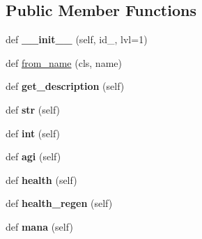 \subsection*{Public Member Functions}
\begin{DoxyCompactItemize}
\item 
def {\bfseries \+\_\+\+\_\+init\+\_\+\+\_\+} (self, id\+\_\+, lvl=1)\hypertarget{classatod_1_1heroes_1_1_hero_a586daa470e18af152e442e70a594155b}{}\label{classatod_1_1heroes_1_1_hero_a586daa470e18af152e442e70a594155b}

\item 
def \hyperlink{classatod_1_1heroes_1_1_hero_ac2ba0862900a63e0a1f1d7a09111eb5f}{from\+\_\+name} (cls, name)
\item 
def {\bfseries get\+\_\+description} (self)\hypertarget{classatod_1_1heroes_1_1_hero_a830f17ec9fc71501b8bea6224814719f}{}\label{classatod_1_1heroes_1_1_hero_a830f17ec9fc71501b8bea6224814719f}

\item 
def {\bfseries str} (self)\hypertarget{classatod_1_1heroes_1_1_hero_ae64ab4c614f0131ffcc8d8fdfc4fc589}{}\label{classatod_1_1heroes_1_1_hero_ae64ab4c614f0131ffcc8d8fdfc4fc589}

\item 
def {\bfseries int} (self)\hypertarget{classatod_1_1heroes_1_1_hero_aacbd6a3822e3cf59cd4108c4ea38d9e1}{}\label{classatod_1_1heroes_1_1_hero_aacbd6a3822e3cf59cd4108c4ea38d9e1}

\item 
def {\bfseries agi} (self)\hypertarget{classatod_1_1heroes_1_1_hero_a267930ec44b1f9d9a389ec899775fddf}{}\label{classatod_1_1heroes_1_1_hero_a267930ec44b1f9d9a389ec899775fddf}

\item 
def {\bfseries health} (self)\hypertarget{classatod_1_1heroes_1_1_hero_a2deaa7c2b1e486817cdbfdb91903910f}{}\label{classatod_1_1heroes_1_1_hero_a2deaa7c2b1e486817cdbfdb91903910f}

\item 
def {\bfseries health\+\_\+regen} (self)\hypertarget{classatod_1_1heroes_1_1_hero_ad1ca633d554d2fe7910850049d204481}{}\label{classatod_1_1heroes_1_1_hero_ad1ca633d554d2fe7910850049d204481}

\item 
def {\bfseries mana} (self)\hypertarget{classatod_1_1heroes_1_1_hero_a9ccad513e9c5f0921b3d4fe6c3abaa85}{}\label{classatod_1_1heroes_1_1_hero_a9ccad513e9c5f0921b3d4fe6c3abaa85}


\end{DoxyCompactItemize}
